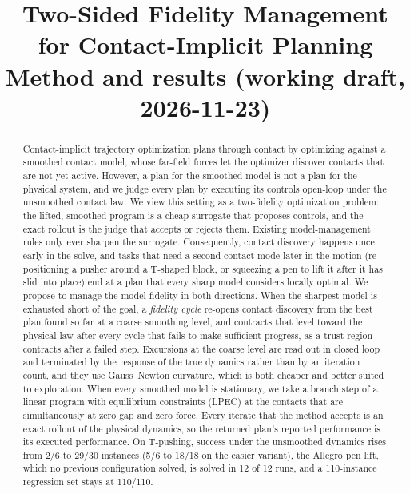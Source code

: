 \documentclass[11pt]{article}
\title{Two-Sided Fidelity Management for Contact-Implicit Planning\\[2pt]
\large Method and results (working draft, 2026-11-23)}
\author{}
\date{}
\theoremstyle{remark}
\begin{document}
\maketitle

\begin{abstract}
Contact-implicit trajectory optimization plans through contact by optimizing against a smoothed contact model, whose far-field forces let the optimizer discover contacts that are not yet active. However, a plan for the smoothed model is not a plan for the physical system, and we judge every plan by executing its controls open-loop under the unsmoothed contact law. We view this setting as a two-fidelity optimization problem: the lifted, smoothed program is a cheap surrogate that proposes controls, and the exact rollout is the judge that accepts or rejects them. Existing model-management rules only ever sharpen the surrogate. Consequently, contact discovery happens once, early in the solve, and tasks that need a second contact mode later in the motion (re-positioning a pusher around a T-shaped block, or squeezing a pen to lift it after it has slid into place) end at a plan that every sharp model considers locally optimal. We propose to manage the model fidelity in both directions. When the sharpest model is exhausted short of the goal, a \emph{fidelity cycle} re-opens contact discovery from the best plan found so far at a coarse smoothing level, and contracts that level toward the physical law after every cycle that fails to make sufficient progress, as a trust region contracts after a failed step. Excursions at the coarse level are read out in closed loop and terminated by the response of the true dynamics rather than by an iteration count, and they use Gauss--Newton curvature, which is both cheaper and better suited to exploration. When every smoothed model is stationary, we take a branch step of a linear program with equilibrium constraints (LPEC) at the contacts that are simultaneously at zero gap and zero force. Every iterate that the method accepts is an exact rollout of the physical dynamics, so the returned plan's reported performance is its executed performance. On T-pushing, success under the unsmoothed dynamics rises from 2/6 to 29/30 instances (5/6 to 18/18 on the easier variant), the Allegro pen lift, which no previous configuration solved, is solved in 12 of 12 runs, and a 110-instance regression set stays at 110/110.
\end{abstract}

\end{document}
